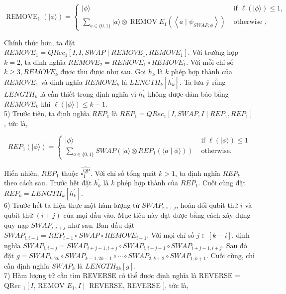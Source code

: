 \documentclass[10pt]{article}
\begin{document}
$$
\operatorname{REMOVE}_{1}(|\phi\rangle)= \begin{cases}|\phi\rangle & \text { if } \ell(|\phi\rangle) \leq 1, \\ \sum_{a \in\{0,1\}}|a\rangle \otimes \operatorname{REMOV} E_{1}\left(\left\langle a \mid \psi_{S W A P, \phi}\right\rangle\right) & \text { otherwise },\end{cases}
$$

Chính thức hơn, ta đặt $R E M O V E_{1}=Q R e c_{1}\left[I, I, S W A P \mid R E M O V E_{1}, R E M O V E_{1}\right]$. Với trường hợp $k=2$, ta định nghĩa $R E M O V E_{2}=R E M O V E_{1} \circ R E M O V E_{1}$. Với mỗi chỉ số $k \geq 3, R E M O V E_{k}$ được thu được như sau. Gọi $h_{k}^{\prime}$ là $k$ phép hợp thành của $R E M O V E_{1}$ và định nghĩa $R E M O V E_{k}$ là $L E N G T H_{k}\left[h_{k}^{\prime}\right]$. Ta lưu ý rằng $L E N G T H_{k}$ là cần thiết trong định nghĩa vì $h_{k}^{\prime}$ không được đảm bảo bằng $R E M O V E_{k}$ khi $\ell(|\phi\rangle) \leq k-1$.\\
5) Trước tiên, ta định nghĩa $R E P_{1}$ là $R E P_{1}=Q R e c_{1}\left[I, S W A P, I \mid R E P_{1}, R E P_{1}\right]$, tức là,

$$
R E P_{1}(|\phi\rangle)= \begin{cases}|\phi\rangle & \text { if } \ell(|\phi\rangle) \leq 1 \\ \sum_{a \in\{0,1\}} S W A P\left(|a\rangle \otimes R E P_{1}(\langle a \mid \phi\rangle)\right) & \text { otherwise. }\end{cases}
$$

Hiển nhiên, $R E P_{1}$ thuộc $\widehat{\square_{1}^{\mathrm{QP}}}$. Với chỉ số tổng quát $k>1$, ta định nghĩa $R E P_{k}$ theo cách sau. Trước hết đặt $h_{k}^{\prime}$ là $k$ phép hợp thành của $R E P_{1}$. Cuối cùng đặt $R E P_{k}=L E N G T H_{k}\left[h_{k}^{\prime}\right]$.\\
6) Trước hết ta hiện thực một hàm lượng tử $S W A P_{i, i+j}$, hoán đổi qubit thứ $i$ và qubit thứ $(i+j)$ của mọi đầu vào. Mục tiêu này đạt được bằng cách xây dựng quy nạp $S W A P_{i, i+j}$ như sau. Ban đầu đặt $S W A P_{i, i+1}=R E P_{i-1} \circ S W A P \circ R E M O V E_{i-1}$. Với mọi chỉ số $j \in[k-i]$, định nghĩa $S W A P_{i, i+j}= S W A P_{i+j-1, i+j} \circ S W A P_{i, i+j-1} \circ S W A P_{i+j-1, i+j}$. Sau đó đặt $g=S W A P_{k, 2 k} \circ S W A P_{k-1,2 k-1} \circ \cdots \circ S W A P_{2, k+2} \circ S W A P_{1, k+1}$. Cuối cùng, chỉ cần định nghĩa $S W A P_{k}$ là $L E N G T H_{2 k}[g]$.\\
7) Hàm lượng tử cần tìm REVERSE có thể được định nghĩa là REVERSE = QRec $_{1}\left[I\right.$, REMOV $E_{1}, I \mid$ REVERSE, REVERSE $]$, tức là,
\end{document}
